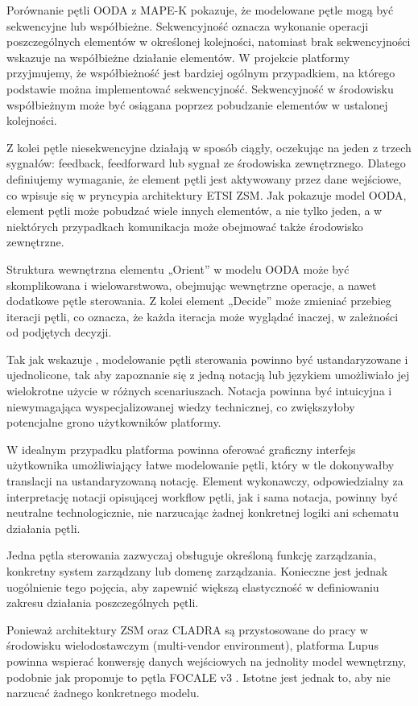Porównanie pętli OODA z MAPE-K pokazuje, że modelowane pętle mogą być sekwencyjne lub współbieżne. Sekwencyjność oznacza wykonanie operacji poszczególnych elementów w określonej kolejności, natomiast brak sekwencyjności wskazuje na współbieżne działanie elementów. W projekcie platformy przyjmujemy, że współbieżność jest bardziej ogólnym przypadkiem, na którego podstawie można implementować sekwencyjność. Sekwencyjność w środowisku współbieżnym może być osiągana poprzez pobudzanie elementów w ustalonej kolejności.

Z kolei pętle niesekwencyjne działają w sposób ciągły, oczekując na jeden z trzech sygnałów: feedback, feedforward lub sygnał ze środowiska zewnętrznego. Dlatego definiujemy wymaganie, że element pętli jest aktywowany przez dane wejściowe, co wpisuje się w pryncypia architektury ETSI ZSM. Jak pokazuje model OODA, element pętli może pobudzać wiele innych elementów, a nie tylko jeden, a w niektórych przypadkach komunikacja może obejmować także środowisko zewnętrzne.

Struktura wewnętrzna elementu „Orient” w modelu OODA może być skomplikowana i wielowarstwowa, obejmując wewnętrzne operacje, a nawet dodatkowe pętle sterowania. Z kolei element „Decide” może zmieniać przebieg iteracji pętli, co oznacza, że każda iteracja może wyglądać inaczej, w zależności od podjętych decyzji.

Tak jak wskazuje \cite{fallon2019}, modelowanie pętli sterowania powinno być ustandaryzowane i ujednolicone, tak aby zapoznanie się z jedną notacją lub językiem umożliwiało jej wielokrotne użycie w różnych scenariuszach. Notacja powinna być intuicyjna i niewymagająca wyspecjalizowanej wiedzy technicznej, co zwiększyłoby potencjalne grono użytkowników platformy.

W idealnym przypadku platforma powinna oferować graficzny interfejs użytkownika umożliwiający łatwe modelowanie pętli, który w tle dokonywałby translacji na ustandaryzowaną notację. Element wykonawczy, odpowiedzialny za interpretację notacji opisującej workflow pętli, jak i sama notacja, powinny być neutralne technologicznie, nie narzucając żadnej konkretnej logiki ani schematu działania pętli.

Jedna pętla sterowania zazwyczaj obsługuje określoną funkcję zarządzania, konkretny system zarządzany lub domenę zarządzania. Konieczne jest jednak uogólnienie tego pojęcia, aby zapewnić większą elastyczność w definiowaniu zakresu działania poszczególnych pętli.

Ponieważ architektury ZSM oraz CLADRA są przystosowane do pracy w środowisku wielodostawczym (multi-vendor environment), platforma Lupus powinna wspierać konwersję danych wejściowych na jednolity model wewnętrzny, podobnie jak proponuje to pętla FOCALE v3 \cite{strassner2009}. Istotne jest jednak to, aby nie narzucać żadnego konkretnego modelu.

